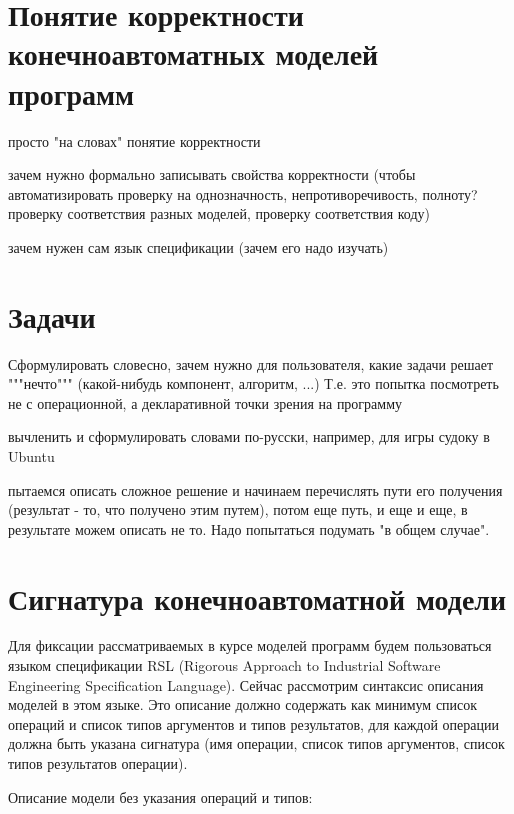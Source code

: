 \documentclass[14pt, twoside]{extreport}
\begin{document}
\section{Понятие корректности конечноавтоматных моделей программ}

просто "на словах" понятие корректности

зачем нужно формально записывать свойства корректности (чтобы автоматизировать проверку на однозначность, непротиворечивость, полноту? проверку соответствия разных моделей, проверку соответствия коду)

зачем нужен сам язык спецификации (зачем его надо изучать)

\section*{Задачи}
Сформулировать словесно, зачем нужно для пользователя, какие задачи решает """нечто""" (какой-нибудь компонент, алгоритм, ...) Т.е. это попытка посмотреть не с операционной, а декларативной точки зрения на программу

вычленить и сформулировать словами по-русски, например, для игры судоку в Ubuntu

пытаемся описать сложное решение и начинаем перечислять пути его получения (результат - то, что получено этим путем), потом еще путь, и еще и еще, в результате можем описать не то. Надо попытаться подумать "в общем случае".

\section{Сигнатура конечноавтоматной модели}


Для фиксации рассматриваемых в курсе моделей программ будем пользоваться языком спецификации RSL (Rigorous Approach to Industrial Software Engineering Specification Language). Сейчас рассмотрим синтаксис описания моделей в этом языке. Это описание должно содержать как минимум список операций и список типов аргументов и типов результатов, для каждой операции должна быть указана сигнатура (имя операции, список типов аргументов, список типов результатов операции).

Описание модели без указания операций и типов:
\end{document}
